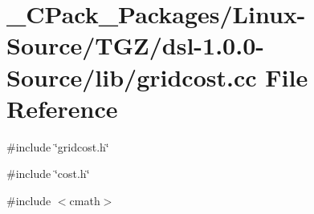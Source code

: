 \section{\_\-CPack\_\-Packages/Linux-\/Source/TGZ/dsl-\/1.0.0-\/Source/lib/gridcost.cc File Reference}
\label{__CPack__Packages_2Linux-Source_2TGZ_2dsl-1_80_80-Source_2lib_2gridcost_8cc}
{\ttfamily \#include \char`\"{}gridcost.h\char`\"{}}\par
{\ttfamily \#include \char`\"{}cost.h\char`\"{}}\par
{\ttfamily \#include $<$cmath$>$}\par
